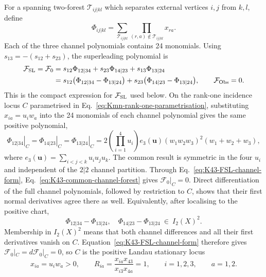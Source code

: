 \documentclass[a4paper,11pt]{article}
\newcommand{\FSL}{\mathcal F_{\rm SL}}
\newcommand{\FObs}{\mathcal F_{\rm Obs}}
\begin{document}
For a spanning two-forest \(\mathcal T_{ij|kl}\) which separates external
vertices \(i,j\) from \(k,l\), define
\begin{equation}
 \Phi_{ij|kl}
 =\sum_{\mathcal T_{ij|kl}}
   \prod_{(r,a)\notin\mathcal T_{ij|kl}}x_{ra} .
 \label{eq:K43-channel-forest-polynomials}
\end{equation}
Each of the three channel polynomials contains 24 monomials.  Using
\(s_{13}=-(s_{12}+s_{23})\), the superleading polynomial is
\begin{align}
 \FSL=\mathcal F_0
 &=
 s_{12}\Phi_{12|34}+s_{23}\Phi_{14|23}
 +s_{13}\Phi_{13|24}
 \nonumber\\
 &=
 s_{12}\bigl(\Phi_{12|34}-\Phi_{13|24}\bigr)
 +s_{23}\bigl(\Phi_{14|23}-\Phi_{13|24}\bigr),
 \qquad \FObs=0 .
 \label{eq:K43-FSL-channel-form}
\end{align}
This is the compact expression for \(\FSL\) used below.  On the rank-one
incidence locus \(C\) parametrised in
Eq.~\eqref{eq:Kmn-rank-one-parametrisation}, substituting
\(x_{ia}=u_iw_a\) into the 24 monomials of each channel polynomial gives the
same positive polynomial,
\begin{equation}
 \left.\Phi_{12|34}\right|_C
 =\left.\Phi_{14|23}\right|_C
 =\left.\Phi_{13|24}\right|_C
 =2\!\left(\prod_{i=1}^4u_i\right)
 e_3(\boldsymbol u)(w_1w_2w_3)^2(w_1+w_2+w_3),
 \label{eq:K43-common-channel-forest}
\end{equation}
where \(e_3(\boldsymbol u)=\sum_{i<j<k}u_i u_j u_k\).  The common result is
symmetric in the four \(u_i\) and independent of the \(2|2\) channel
partition.  Through Eq.~\eqref{eq:K43-FSL-channel-form},
Eq.~\eqref{eq:K43-common-channel-forest} gives
\(\mathcal F_0|_C=0\).  Direct differentiation of the full channel
polynomials, followed by restriction to \(C\), shows that their first normal
derivatives agree there as well.  Equivalently, after localising to the
positive chart,
\begin{equation}
 \Phi_{12|34}-\Phi_{13|24},\quad
 \Phi_{14|23}-\Phi_{13|24}
 \ \in\ I_2(X)^2 .
 \label{eq:K43-channel-differences-square-ideal}
\end{equation}
Membership in \(I_2(X)^2\) means that both channel differences and all their
first derivatives vanish on \(C\).  Equation~\eqref{eq:K43-FSL-channel-form}
therefore gives \(\mathcal F_0|_C=d\mathcal F_0|_C=0\), so \(C\) is the
positive Landau stationary locus
\begin{equation}
 x_{ia}=u_i w_a>0,
 \qquad
 R_{ia}=\frac{x_{ia}x_{43}}{x_{i3}x_{4a}}=1,
 \qquad i=1,2,3,\qquad a=1,2.
 \label{eq:K43-positive-rank-one-locus}
\end{equation}
\end{document}
